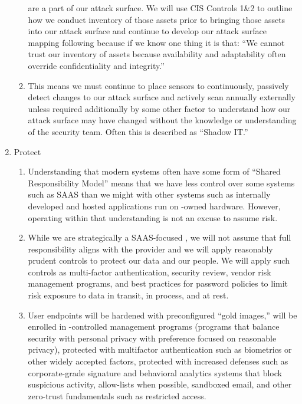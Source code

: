 \documentclass[../main.tex]{subfiles}
\begin{document}
\begin{enumerate}
\begin{enumerate}
        are a part of our attack surface. We will use CIS Controls 1\&2 to outline how we conduct inventory of those assets prior to bringing those assets into our attack surface and continue to
        develop our attack surface mapping following because if we know one thing it is that: “We cannot trust our inventory of assets because availability and adaptability often override
        confidentiality and integrity.”
        \item This means we must continue to place sensors to continuously, passively detect changes to our attack surface and actively scan annually externally unless required additionally by
        some other factor to understand how our attack surface may have changed without the knowledge or understanding of the security team. Often this is described as “Shadow IT.”
    \end{enumerate}
    \item Protect
    \begin{enumerate}
        \item Understanding that modern systems often have some form of “Shared Responsibility Model” means that we have less control over some systems such as SAAS than we might with other
        systems such as internally developed and hosted applications run on \CompanyName-owned hardware. However, operating within that understanding is not an excuse to assume risk.
        \item While we are strategically a SAAS-focused \CompanyName, we will not assume that full responsibility aligns with the provider and we will apply reasonably prudent controls to protect our
        data and our people. We will apply such controls as multi-factor authentication, security review, vendor risk management programs, and best practices for password policies to limit risk
        exposure to data in transit, in process, and at rest.
        \item User endpoints will be hardened with preconfigured “gold images,” will be enrolled in \CompanyName-controlled management programs (programs that balance security with personal privacy
        with preference focused on reasonable privacy), protected with multifactor authentication such as biometrics or other widely accepted factors, protected with increased defenses such as
        corporate-grade signature and behavioral analytics systems that block suspicious activity, allow-lists when possible, sandboxed email, and other zero-trust fundamentals such as restricted
        access.
    \end{enumerate}

\end{enumerate}
\end{document}
